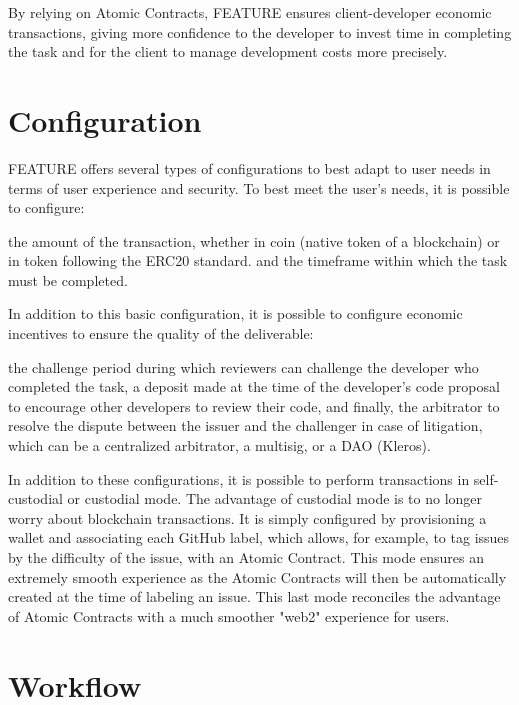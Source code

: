 \documentclass[
	a4paper, %
	10pt, %
	unnumberedsections, %
	twoside, %
]{LTJournalArticle}
\begin{document}
By relying on Atomic Contracts, FEATURE ensures client-developer economic transactions, giving more confidence to the developer to invest time in completing the task and for the client to manage development costs more precisely.


\section{Configuration}

FEATURE offers several types of configurations to best adapt to user needs in terms of user experience and security. To best meet the user's needs, it is possible to configure:

the amount of the transaction, whether in coin (native token of a blockchain) or in token following the ERC20 standard.
and the timeframe within which the task must be completed.

In addition to this basic configuration, it is possible to configure economic incentives to ensure the quality of the deliverable:

the challenge period during which reviewers can challenge the developer who completed the task,
a deposit made at the time of the developer's code proposal to encourage other developers to review their code,
and finally, the arbitrator to resolve the dispute between the issuer and the challenger in case of litigation, which can be a centralized arbitrator, a multisig, or a DAO (Kleros).

In addition to these configurations, it is possible to perform transactions in self-custodial or custodial mode. The advantage of custodial mode is to no longer worry about blockchain transactions. It is simply configured by provisioning a wallet and associating each GitHub label, which allows, for example, to tag issues by the difficulty of the issue, with an Atomic Contract. This mode ensures an extremely smooth experience as the Atomic Contracts will then be automatically created at the time of labeling an issue. This last mode reconciles the advantage of Atomic Contracts with a much smoother "web2" experience for users.



\section{Workflow}
\end{document}
